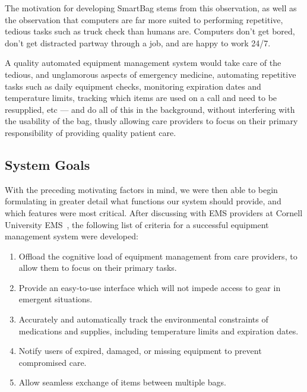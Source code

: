 \documentclass{sigchi}
\begin{document}
The motivation for developing SmartBag stems from this observation, as well
as the observation that computers are far more suited to performing repetitive,
tedious tasks such as truck check than humans are. Computers don't get bored,
don't get distracted partway through a job, and are happy to work 24/7.

A quality automated equipment management system would take care of the tedious,
and unglamorous aspects of emergency medicine, automating repetitive tasks such
as daily equipment checks, monitoring expiration dates and temperature limits,
tracking which items are used on a call and need to be resupplied, etc --- and
do all of this in the background, without interfering with the usability of the
bag, thusly allowing care providers to focus on their primary responsibility of
providing quality patient care.


\subsection{System Goals} \label{goals}
With the preceding motivating factors in mind, we were then able to begin
formulating in greater detail what functions our system should provide,
and which features were most critical. After discussing with EMS providers
at Cornell University EMS~\cite{cuems}, the following list of criteria for
a successful equipment management system were developed:

\begin{enumerate}
\item \label{goal:focus}
	Offload the cognitive load of equipment management from
	care providers,	to allow them to focus on their primary tasks.

\item \label{goal:access}
	Provide an easy-to-use interface which will not impede
	access to gear in emergent situations.

\item \label{goal:accuracy}
	Accurately and automatically track the environmental
	constraints of medications and	supplies, including temperature limits
    and expiration dates.

\item \label{goal:safety}
	Notify users of expired, damaged, or missing equipment
	to prevent compromised care.

\item \label{goal:exchange}
	Allow seamless exchange of items between multiple bags.
\end{enumerate}
\end{document}
